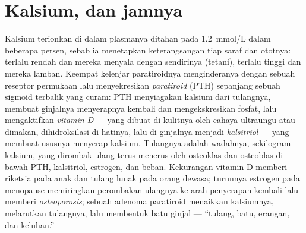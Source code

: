 \section{Kalsium, dan jamnya}

\begin{definition}\label{def:b3:endocrinology:calcium}
Kalsium terionkan di dalam plasmanya ditahan pada \qty{1.2}{mmol/L} dalam beberapa
persen, sebab ia menetapkan keterangsangan tiap saraf dan ototnya: terlalu
rendah dan mereka menyala dengan sendirinya (tetani), terlalu tinggi dan mereka
lamban. Keempat kelenjar paratiroidnya menginderanya dengan sebuah reseptor permukaan
lalu menyekresikan \emph{ paratiroid} (PTH) sepanjang sebuah sigmoid terbalik
yang curam: PTH menyiagakan kalsium dari tulangnya, membuat ginjalnya menyerapnya kembali
dan mengekskresikan fosfat, lalu mengaktifkan \emph{vitamin D} --- yang dibuat di kulitnya
oleh cahaya ultraungu atau dimakan, dihidroksilasi di hatinya, lalu di ginjalnya
menjadi \emph{kalsitriol} --- yang membuat ususnya menyerap kalsium. Tulangnya adalah
wadahnya, sekilogram kalsium, yang dirombak ulang terus-menerus oleh
osteoklas dan osteoblas di bawah PTH, kalsitriol, estrogen, dan beban.
Kekurangan vitamin D memberi riketsia pada anak dan tulang lunak pada
orang dewasa; turunnya estrogen pada menopause memiringkan perombakan ulangnya ke arah
penyerapan kembali lalu memberi \emph{osteoporosis}; sebuah adenoma paratiroid menaikkan
kalsiumnya, melarutkan tulangnya, lalu membentuk batu ginjal --- ``tulang, batu,
erangan, dan keluhan.''
\end{definition}

